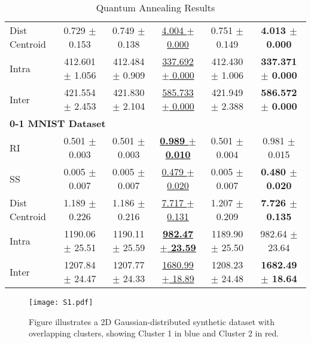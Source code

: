 \documentclass[showpacs,twocolumn,superscriptaddress]{revtex4-2}
\begin{document}
\begin{table*}[!ht]
\begin{tabular}{lccccc}
    Dist Centroid & 0.729 $\pm$ 0.153 & 0.749 $\pm$ 0.138 & \underline{4.004 $\pm$ 0.000} & 0.751 $\pm$ 0.149 & \textbf{4.013 $\pm$ 0.000} \\
    Intra & 412.601 $\pm$ 1.056 & 412.484 $\pm$ 0.909 & \underline{337.692 $\pm$ 0.000} & 412.430 $\pm$ 1.006 & \textbf{337.371 $\pm$ 0.000} \\
    Inter & 421.554 $\pm$ 2.453 & 421.830 $\pm$ 2.104 & \underline{585.733 $\pm$ 0.000} & 421.949 $\pm$ 2.388 & \textbf{586.572 $\pm$ 0.000} \\
    \midrule
    \multicolumn{6}{l}{\textbf{0-1 MNIST Dataset}} \\
    RI & 0.501 $\pm$ 0.003 & 0.501 $\pm$ 0.003 & \underline{\textbf{0.989 $\pm$ 0.010}} & 0.501 $\pm$ 0.004 & 0.981 $\pm$ 0.015 \\
    SS & 0.005 $\pm$ 0.007 & 0.005 $\pm$ 0.007 & \underline{0.479 $\pm$ 0.020} & 0.005 $\pm$ 0.007 & \textbf{0.480 $\pm$ 0.020} \\
    Dist Centroid & 1.189 $\pm$ 0.226 & 1.186 $\pm$ 0.216 & \underline{7.717 $\pm$ 0.131} & 1.207 $\pm$ 0.209 & \textbf{7.726 $\pm$ 0.135} \\
    Intra & 1190.06 $\pm$ 25.51 & 1190.11 $\pm$ 25.59 & \underline{\textbf{982.47 $\pm$ 23.59}} & 1189.90 $\pm$ 25.50 & 982.64 $\pm$ 23.64 \\
    Inter & 1207.84 $\pm$ 24.47 & 1207.77 $\pm$ 24.33 & \underline{1680.99 $\pm$ 18.89} & 1208.23 $\pm$ 24.48 & \textbf{1682.49 $\pm$ 18.64} \\
    \bottomrule
    \end{tabular}
    \caption{Quantum Annealing Results}
\end{table*}

\begin{figure*}[!ht]
\begin{minipage}[c]{\linewidth}
    \centering
    \texttt{[image: S1.pdf]}
    \caption{Figure illustrates a 2D Gaussian-distributed synthetic dataset with overlapping clusters, showing Cluster 1 in blue and Cluster 2 in red.}
    \label{fig:gsoverlap}
\end{minipage}
\end{figure*}
\end{document}
